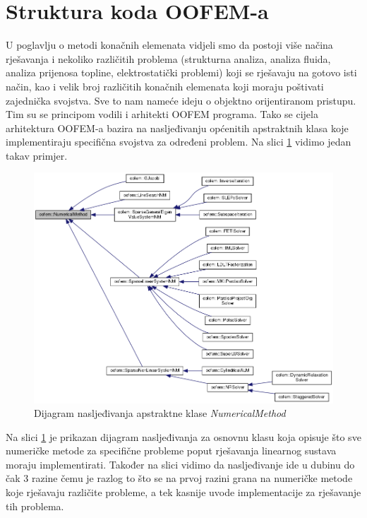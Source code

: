 \documentclass[a4paper,twoside,12pt]{memoir} %
\begin{document}
\section{Struktura koda OOFEM-a}
\label{poglavlje:struktura_koda}
U poglavlju o metodi konačnih elemenata vidjeli smo da postoji više načina rješavanja i nekoliko različitih problema (strukturna analiza, analiza fluida, analiza prijenosa topline, elektrostatički problemi) koji se rješavaju na gotovo isti način, kao i velik broj različitih konačnih elemenata koji moraju poštivati zajednička svojstva. Sve to nam nameće ideju o objektno orijentiranom pristupu. Tim su se principom vodili i arhitekti OOFEM programa. Tako se cijela arhitektura OOFEM-a bazira na nasljeđivanju općenitih apstraktnih klasa koje implementiraju specifična svojstva za određeni problem. Na slici \ref{fig:numerical_method_inheritance} vidimo jedan takav primjer.
\begin{figure}[h!t]
\begin{center}
\includegraphics[scale=0.46]{pictures/chapter_oofem/NumericalMethod_inheritance.png}
\caption{Dijagram nasljeđivanja apstraktne klase \textit{NumericalMethod} \cite{oofem_reference}}
\label{fig:numerical_method_inheritance}
\end{center}
\end{figure}
Na slici \ref{fig:numerical_method_inheritance} je prikazan dijagram nasljeđivanja za osnovnu klasu koja opisuje što sve numeričke metode za specifične probleme poput rješavanja linearnog sustava moraju implementirati. Također na slici vidimo da nasljeđivanje ide u dubinu do čak 3 razine čemu je razlog to što se na prvoj razini grana na numeričke metode koje rješavaju različite probleme, a tek kasnije uvode implementacije za rješavanje tih problema. \par
\end{document}
